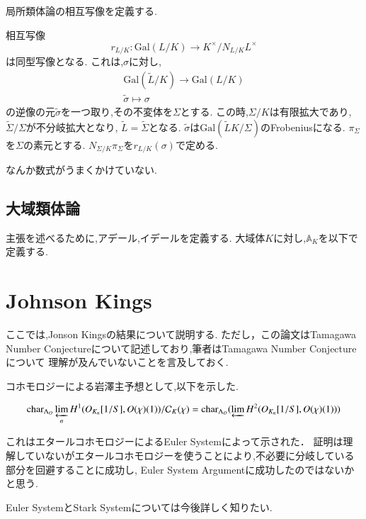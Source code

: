 \documentclass{ujarticle}
\begin{document}
局所類体論の相互写像を定義する.
\begin{thm}
  相互写像
\begin{equation*}
  r_{L/K}: \mathrm{Gal}(L/K) \to K^{\times}/N_{L/K}L^{\times}
\end{equation*}
は同型写像となる.
これは,$\sigma$に対し,
\begin{align}
  \mathrm{Gal}(\tilde{L}/K) \to \mathrm{Gal}(L/K) \\
    \tilde{\sigma} \mapsto \sigma
\end{align}
の逆像の元$\tilde{\sigma}$を一つ取り,その不変体を$\Sigma$とする.
この時,$\Sigma/K$は有限拡大であり,$\tilde{\Sigma}/\Sigma$が不分岐拡大となり,
$\tilde{L}=\tilde{\Sigma}$となる.
$\tilde{\sigma}$は$\mathrm{Gal}(\tilde{L}K/\Sigma)$のFrobeniusになる.
$\pi_{\Sigma}$を$\Sigma$の素元とする.
$N_{\Sigma/K}\pi_{\Sigma}$を$r_{L/K}(\sigma)$で定める.
\end{thm}
\begin{rem}
 なんか数式がうまくかけていない.
\end{rem}

\subsection{大域類体論}
\label{sub:大域類体論}
主張を述べるために,アデール,イデールを定義する.
大域体$K$に対し,$\mathbb{A}_K$を以下で定義する.


\section{Johnson Kings}
\label{sec:Johnson Kings}

ここでは,Jonson Kingsの結果について説明する.
ただし，この論文はTamagawa Number Conjectureについて記述しており,筆者はTamagawa Number Conjectureについて
理解が及んでいないことを言及しておく.

コホモロジーによる岩澤主予想として,以下を示した.
\begin{thm} 
\begin{equation*}
\mathrm{char}_{\Lambda_O}\varprojlim\limits_n H^1(O_{K_n}[1/S], O(\chi)(1)) /\mathcal{C}_K(\chi) = \mathrm{char}_{\Lambda_O}(\varprojlim H^2(O_{K_n}[1/S], O(\chi)(1)))
\end{equation*}
\end{thm}

これはエタールコホモロジーによるEuler Systemによって示された．
証明は理解していないがエタールコホモロジーを使うことにより,不必要に分岐している部分を回避することに成功し,
Euler System Argumentに成功したのではないかと思う.
\begin{rem}
  Euler SystemとStark Systemについては今後詳しく知りたい.
\end{rem}
\end{document}
